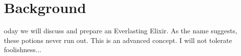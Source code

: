 \section{Background}
\label{sec:background}


oday we will discuss and prepare an Everlasting Elixir. As the name suggests, these potions never run out. This is an advanced concept. I will not tolerate foolishness...
